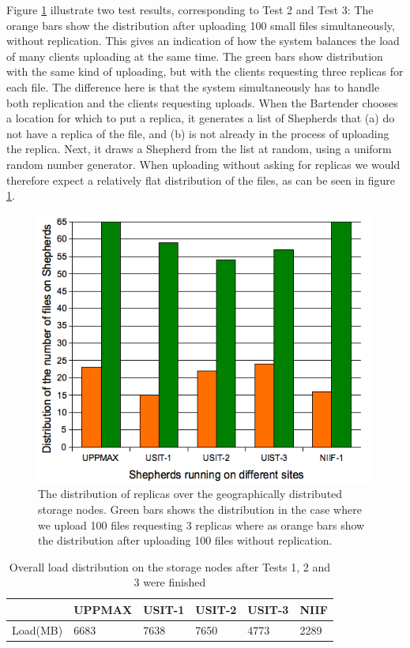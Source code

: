 \documentclass[final]{ieee}
\begin{document}
Figure \ref{fig:FileDistribution} illustrate two test results,
corresponding to Test 2 and Test 3: The orange bars show the distribution after uploading 100 small files
simultaneously, without replication. This gives an indication of how
the system balances the load of many clients uploading at the same
time. The green bars show distribution with the same kind of
uploading, but with the clients requesting three replicas for each file. The
difference here is that the system simultaneously has to handle both
replication and the clients requesting uploads. When the Bartender chooses
a location for which to put a replica, it generates a list of
Shepherds that (a) do not have a replica of the file, and (b) is not
already in the process of uploading the replica. Next, it draws a
Shepherd from the list at random, using a uniform random number
generator. When uploading without asking for replicas we would
therefore expect a relatively flat distribution of the files, as can
be seen in figure \ref{fig:FileDistribution}. 

\begin{figure}
\centering
\includegraphics[width=0.8\columnwidth]{FileDistribution}
\caption{The distribution of replicas over the geographically distributed
  storage nodes. Green bars shows the distribution in the case where
  we upload 100 files requesting 3 replicas where as orange bars show
  the distribution after uploading 100 files without replication. }
\label{fig:FileDistribution}
\end{figure}

\begin{table}[ht]
\centering
\begin{tabular}[width = \columnwidth]{llllll}
\hline \hline
&\small{UPPMAX}&\small{USIT-1}&\small{USIT-2}&\small{USIT-3}&\small{NIIF}\\
\hline
           \small{Load(MB)}&6683&7638&7650&4773&2289\\
\hline
\end{tabular}
\caption{Overall load distribution on the storage nodes after Tests 1,
2 and 3 were finished}
\label{table:load distribution}  
\end{table}
\end{document}
